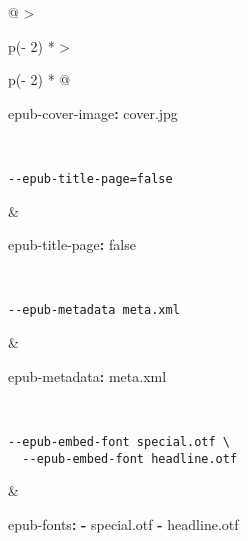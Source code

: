 \documentclass[
  a4paper,
]{article}
\newenvironment{Shaded}{}{}
\newcommand{\AttributeTok}[1]{\textcolor[rgb]{0.49,0.56,0.16}{#1}}
\newcommand{\CharTok}[1]{\textcolor[rgb]{0.25,0.44,0.63}{#1}}
\newcommand{\FunctionTok}[1]{\textcolor[rgb]{0.02,0.16,0.49}{#1}}
\newcommand{\KeywordTok}[1]{\textcolor[rgb]{0.00,0.44,0.13}{\textbf{#1}}}
\begin{document}
\begin{longtable}[]{@{}
  >{\raggedright\arraybackslash}p{(\columnwidth - 2\tabcolsep) * }
  >{\raggedright\arraybackslash}p{(\columnwidth - 2\tabcolsep) * }@{}}
\begin{minipage}[t]{\linewidth}
\begin{Shaded}
\begin{Highlighting}[]
\FunctionTok{epub{-}cover{-}image}\KeywordTok{:}\AttributeTok{ cover.jpg}
\end{Highlighting}
\end{Shaded}
\end{minipage} \\
\begin{minipage}[t]{\linewidth}\raggedright
\begin{verbatim}
--epub-title-page=false
\end{verbatim}
\end{minipage} & \begin{minipage}[t]{\linewidth}\raggedright
\begin{Shaded}
\begin{Highlighting}[]
\FunctionTok{epub{-}title{-}page}\KeywordTok{:}\AttributeTok{ }\CharTok{false}
\end{Highlighting}
\end{Shaded}
\end{minipage} \\
\begin{minipage}[t]{\linewidth}\raggedright
\begin{verbatim}
--epub-metadata meta.xml
\end{verbatim}
\end{minipage} & \begin{minipage}[t]{\linewidth}\raggedright
\begin{Shaded}
\begin{Highlighting}[]
\FunctionTok{epub{-}metadata}\KeywordTok{:}\AttributeTok{ meta.xml}
\end{Highlighting}
\end{Shaded}
\end{minipage} \\
\begin{minipage}[t]{\linewidth}\raggedright
\begin{verbatim}
--epub-embed-font special.otf \
  --epub-embed-font headline.otf
\end{verbatim}
\end{minipage} & \begin{minipage}[t]{\linewidth}\raggedright
\begin{Shaded}
\begin{Highlighting}[]
\FunctionTok{epub{-}fonts}\KeywordTok{:}
\AttributeTok{  }\KeywordTok{{-}}\AttributeTok{ special.otf}
\AttributeTok{  }\KeywordTok{{-}}\AttributeTok{ headline.otf}

\end{Highlighting}
\end{Shaded}
\end{minipage}
\end{longtable}
\end{document}
